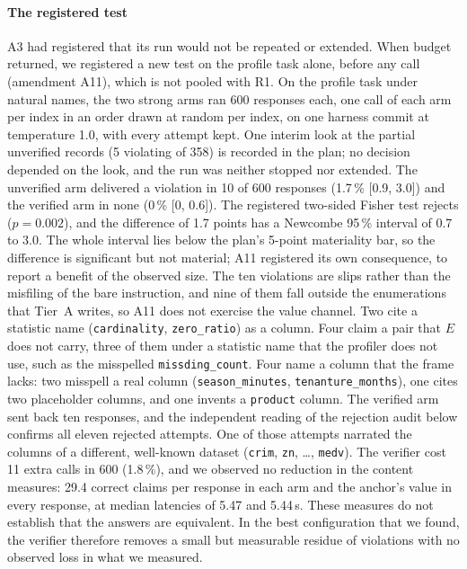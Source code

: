 \documentclass[smallextended,natbib]{svjour3}
\begin{document}
\paragraph{The registered test}
A3 had registered that its run would not be repeated or extended. When budget
returned, we registered a new test on the profile task alone, before any call
(amendment A11), which is not pooled with R1. On the profile task under natural
names, the two strong arms ran 600 responses each, one call of each arm per
index in an order drawn at random per index, on one harness commit at
temperature 1.0, with every attempt kept. One interim look at the partial
unverified records (5 violating of 358) is recorded in the plan; no decision
depended on the look, and the run was neither stopped nor extended. The unverified arm delivered a violation in 10 of 600
responses (1.7\,\% [0.9, 3.0]) and the verified arm in none (0\,\% [0, 0.6]).
The registered two-sided Fisher test rejects ($p=0.002$), and the difference
of 1.7 points has a Newcombe 95\,\% interval of 0.7 to 3.0. The whole interval
lies below the plan's 5-point materiality bar, so the difference is significant
but not material; A11 registered its own consequence, to report a benefit of the
observed size. The ten violations are slips rather than the misfiling of the
bare instruction, and nine of them fall outside the enumerations that Tier~A
writes, so A11 does not exercise the value channel. Two cite a
statistic name (\texttt{cardinality}, \texttt{zero\_ratio}) as a column. Four
claim a pair that $E$ does not carry, three of them under a statistic name that
the profiler does not use, such as the misspelled \texttt{missding\_count}.
Four name a column that the frame lacks: two misspell a real column
(\texttt{season\_minutes}, \texttt{tenanture\_months}), one cites two
placeholder columns, and one invents a \texttt{product} column. The verified
arm sent back
ten responses, and the independent reading of the rejection audit below
confirms all eleven rejected attempts. One of those attempts narrated the
columns of a different, well-known dataset (\texttt{crim}, \texttt{zn},
\ldots, \texttt{medv}). The verifier cost 11 extra calls in 600 (1.8\,\%), and
we observed no reduction in the content measures: 29.4 correct claims per
response in each arm and the anchor's value in every response, at median
latencies of 5.47 and 5.44\,s. These measures do not establish that the
answers are equivalent. In the best configuration that we found, the verifier
therefore removes a small but measurable residue of violations with no
observed loss in what we measured.
\end{document}
